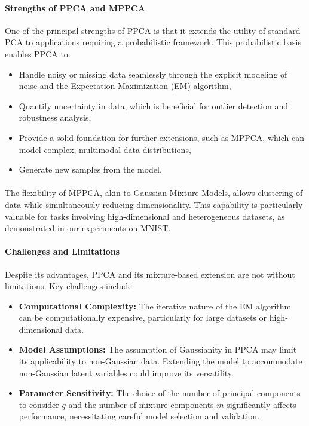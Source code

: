 \documentclass{article}
\begin{document}
\paragraph{Strengths of PPCA and MPPCA} One of the principal strengths of PPCA is that it extends the utility of standard PCA to applications requiring a probabilistic framework. This probabilistic basis enables PPCA to:
\begin{itemize}
    \item Handle noisy or missing data seamlessly through the explicit modeling of noise and the Expectation-Maximization (EM) algorithm,
    \item Quantify uncertainty in data, which is beneficial for outlier detection and robustness analysis,
    \item Provide a solid foundation for further extensions, such as MPPCA, which can model complex, multimodal data distributions,
    \item Generate new samples from the model.
\end{itemize}

\paragraph{} The flexibility of MPPCA, akin to Gaussian Mixture Models, allows clustering of data while simultaneously reducing dimensionality. This capability is particularly valuable for tasks involving high-dimensional and heterogeneous datasets, as demonstrated in our experiments on MNIST.

\paragraph{Challenges and Limitations} Despite its advantages, PPCA and its mixture-based extension are not without limitations. Key challenges include:
\begin{itemize}
    \item \textbf{Computational Complexity:} The iterative nature of the EM algorithm can be computationally expensive, particularly for large datasets or high-dimensional data.
    \item \textbf{Model Assumptions:} The assumption of Gaussianity in PPCA may limit its applicability to non-Gaussian data. Extending the model to accommodate non-Gaussian latent variables could improve its versatility.
    \item \textbf{Parameter Sensitivity:} The choice of the number of principal components to consider $q$ and the number of mixture components $m$ significantly affects performance, necessitating careful model selection and validation.
\end{itemize}




\newpage
\appendix

\section{}
\label{}

\subsection{}
\label{}
\end{document}
